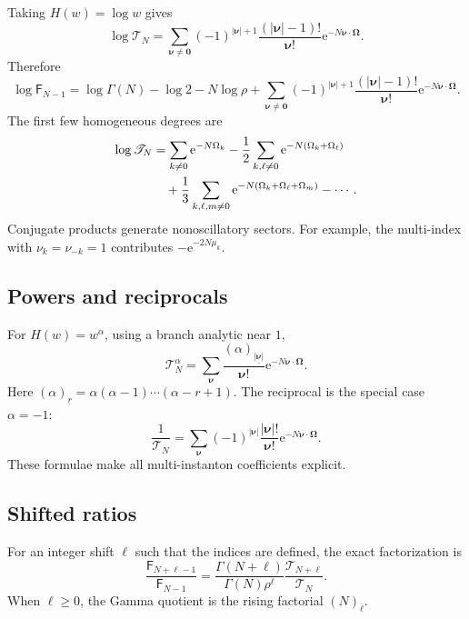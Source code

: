 \documentclass[11pt,oneside]{article}
\numberwithin{equation}{section}
\newcommand{\e}{\mathrm e}
\newcommand{\Fub}{\mathsf F}
\newcommand{\falling}[2]{(#1)_{\underline{#2}}}
\newcommand{\rising}[2]{(#1)_{\overline{#2}}}
\newcommand{\abs}[1]{\left|#1\right|}
\begin{document}
Taking \(H(w)=\log w\) gives
\begin{equation}
 \log\mathscr T_N
 =\sum_{\bm\nu\ne\bm0}
 (-1)^{\abs{\bm\nu}+1}
 \frac{(\abs{\bm\nu}-1)!}{\bm\nu!}
 \e^{-N\bm\nu\cdot\bm\Omega}.
 \label{eq:log-T-multiindex}
\end{equation}
Therefore
\begin{equation}
 \boxed{\displaystyle
 \log\Fub_{N-1}
 =\log\Gamma(N)-\log2-N\log\rho
 +\sum_{\bm\nu\ne\bm0}
 (-1)^{\abs{\bm\nu}+1}
 \frac{(\abs{\bm\nu}-1)!}{\bm\nu!}
 \e^{-N\bm\nu\cdot\bm\Omega}.}
 \label{eq:log-fubini-full}
\end{equation}
The first few homogeneous degrees are
\begin{align}
 \log\mathscr T_N
 &=\sum_{k\ne0}\e^{-N\Omega_k}
 -\frac12\sum_{k,\ell\ne0}\e^{-N(\Omega_k+\Omega_\ell)}
 \notag\\
 &\quad+\frac13\sum_{k,\ell,m\ne0}
  \e^{-N(\Omega_k+\Omega_\ell+\Omega_m)}-\cdots.
 \label{eq:log-T-degrees}
\end{align}
Conjugate products generate nonoscillatory sectors.  For example, the multi-index with \(\nu_k=\nu_{-k}=1\) contributes
\(-\e^{-2N\mu_k}\).

\subsection{Powers and reciprocals}

For \(H(w)=w^\alpha\), using a branch analytic near \(1\),
\begin{equation}
 \boxed{\displaystyle
 \mathscr T_N^\alpha
 =\sum_{\bm\nu}
 \frac{\falling{\alpha}{\abs{\bm\nu}}}{\bm\nu!}
 \e^{-N\bm\nu\cdot\bm\Omega}.}
 \label{eq:power-T-multiindex}
\end{equation}
Here \(\falling{\alpha}{r}=\alpha(\alpha-1)\cdots(\alpha-r+1)\).  The reciprocal is the special case \(\alpha=-1\):
\begin{equation}
 \frac1{\mathscr T_N}
 =\sum_{\bm\nu}
 (-1)^{\abs{\bm\nu}}
 \frac{\abs{\bm\nu}!}{\bm\nu!}
 \e^{-N\bm\nu\cdot\bm\Omega}.
 \label{eq:reciprocal-T-multiindex}
\end{equation}
These formulae make all multi-instanton coefficients explicit.

\subsection{Shifted ratios}

For an integer shift \(\ell\) such that the indices are defined, the exact factorization is
\begin{equation}
 \frac{\Fub_{N+\ell-1}}{\Fub_{N-1}}
 =\frac{\Gamma(N+\ell)}{\Gamma(N)\rho^\ell}
 \frac{\mathscr T_{N+\ell}}{\mathscr T_N}.
 \label{eq:shifted-ratio-factorization}
\end{equation}
When \(\ell\ge0\), the Gamma quotient is the rising factorial \(\rising{N}{\ell}\).
\end{document}
